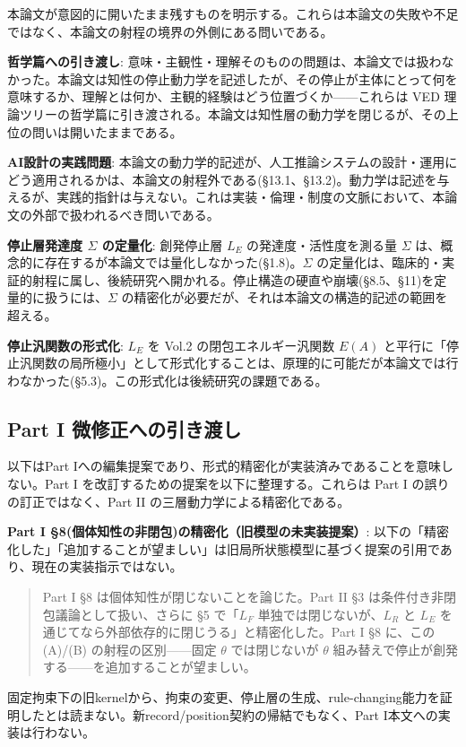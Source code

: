 本論文が意図的に開いたまま残すものを明示する。これらは本論文の失敗や不足ではなく、本論文の射程の境界の外側にある問いである。

\textbf{哲学篇への引き渡し}:
意味・主観性・理解そのものの問題は、本論文では扱わなかった。本論文は知性の停止動力学を記述したが、その停止が主体にとって何を意味するか、理解とは何か、主観的経験はどう位置づくか——これらは VED 理論ツリーの哲学篇に引き渡される。本論文は知性層の動力学を閉じるが、その上位の問いは開いたままである。

\textbf{AI設計の実践問題}:
本論文の動力学的記述が、人工推論システムの設計・運用にどう適用されるかは、本論文の射程外である(\S{}13.1、\S{}13.2)。動力学は記述を与えるが、実践的指針は与えない。これは実装・倫理・制度の文脈において、本論文の外部で扱われるべき問いである。

\textbf{停止層発達度 $\Sigma$ の定量化}:
創発停止層 $L_E$ の発達度・活性度を測る量 $\Sigma$ は、概念的に存在するが本論文では量化しなかった(\S{}1.8)。$\Sigma$ の定量化は、臨床的・実証的射程に属し、後続研究へ開かれる。停止構造の硬直や崩壊(\S{}8.5、\S{}11)を定量的に扱うには、$\Sigma$ の精密化が必要だが、それは本論文の構造的記述の範囲を超える。

\textbf{停止汎関数の形式化}:
$L_E$ を Vol.2 の閉包エネルギー汎関数 $E(A)$ と平行に「停止汎関数の局所極小」として形式化することは、原理的に可能だが本論文では行わなかった(\S{}5.3)。この形式化は後続研究の課題である。

\bigskip


\subsection{Part I 微修正への引き渡し}


以下はPart Iへの編集提案であり、形式的精密化が実装済みであることを意味しない。Part I を改訂するための提案を以下に整理する。これらは Part I の誤りの訂正ではなく、Part II の三層動力学による精密化である。

\textbf{Part I \S{}8(個体知性の非閉包)の精密化（旧模型の未実装提案）}:
以下の「精密化した」「追加することが望ましい」は旧局所状態模型に基づく提案の引用であり、現在の実装指示ではない。\begin{quote}

Part I \S{}8 は個体知性が閉じないことを論じた。Part II \S{}3 は条件付き非閉包議論として扱い、さらに \S{}5 で「$L_F$ 単独では閉じないが、$L_R$ と $L_E$ を通じてなら外部依存的に閉じうる」と精密化した。Part I \S{}8 に、この (A)/(B) の射程の区別——固定 $\theta$ では閉じないが $\theta$ 組み替えで停止が創発する——を追加することが望ましい。

\end{quote}
固定拘束下の旧kernelから、拘束の変更、停止層の生成、rule-changing能力を証明したとは読まない。新record/position契約の帰結でもなく、Part I本文への実装は行わない。

